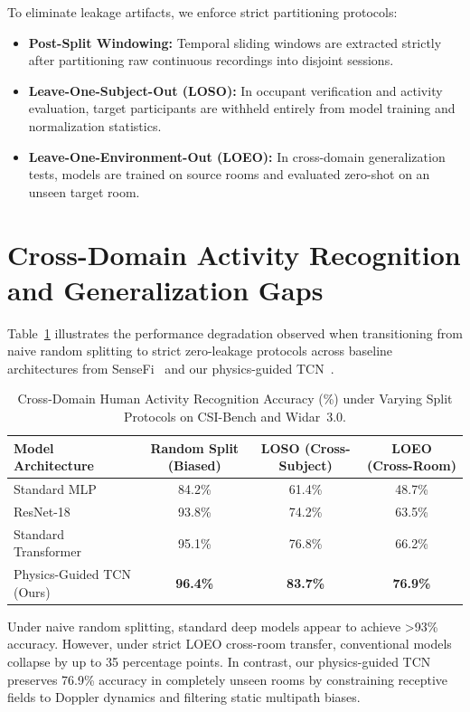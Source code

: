 To eliminate leakage artifacts, we enforce strict partitioning protocols:
\begin{itemize}
    \item \textbf{Post-Split Windowing:} Temporal sliding windows are extracted strictly after partitioning raw continuous recordings into disjoint sessions.
    \item \textbf{Leave-One-Subject-Out (LOSO):} In occupant verification and activity evaluation, target participants are withheld entirely from model training and normalization statistics.
    \item \textbf{Leave-One-Environment-Out (LOEO):} In cross-domain generalization tests, models are trained on source rooms and evaluated zero-shot on an unseen target room.
\end{itemize}

\section{Cross-Domain Activity Recognition and Generalization Gaps}
Table~\ref{tab:har_generalization} illustrates the performance degradation observed when transitioning from naive random splitting to strict zero-leakage protocols across baseline architectures from SenseFi~\cite{yang2022sensefi} and our physics-guided TCN~\cite{physics2026physics}.

\begin{table}[ht]
\centering
\caption{Cross-Domain Human Activity Recognition Accuracy (\%) under Varying Split Protocols on CSI-Bench and Widar~3.0.}
\label{tab:har_generalization}
\begin{tabular}{lccc}
\hline
\textbf{Model Architecture} & \textbf{Random Split (Biased)} & \textbf{LOSO (Cross-Subject)} & \textbf{LOEO (Cross-Room)} \\
\hline
Standard MLP & 84.2\% & 61.4\% & 48.7\% \\
ResNet-18 & 93.8\% & 74.2\% & 63.5\% \\
Standard Transformer & 95.1\% & 76.8\% & 66.2\% \\
Physics-Guided TCN (Ours) & \textbf{96.4\%} & \textbf{83.7\%} & \textbf{76.9\%} \\
\hline
\end{tabular}
\end{table}

Under naive random splitting, standard deep models appear to achieve >93\% accuracy. However, under strict LOEO cross-room transfer, conventional models collapse by up to 35 percentage points. In contrast, our physics-guided TCN~\cite{physics2026physics} preserves 76.9\% accuracy in completely unseen rooms by constraining receptive fields to Doppler dynamics and filtering static multipath biases.

